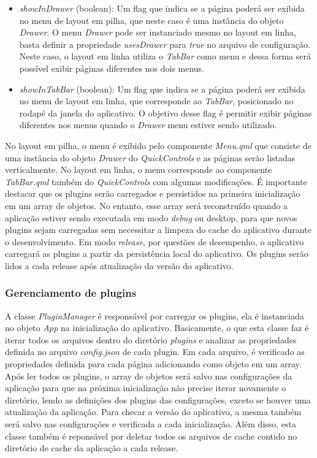 \begin{itemize}
	\item \textit{showInDrawer} (boolean): Um flag que indica se a página poderá ser exibida no menu de layout em pilha, que neste caso é uma instância do objeto \textit{Drawer}. O menu \textit{Drawer} pode ser instanciado mesmo no layout em linha, basta definir a propriedade \textit{usesDrawer} para \textit{true} no arquivo de configuração. Neste caso, o layout em linha utiliza o \textit{TabBar} como menu e dessa forma será possível exibir páginas diferentes nos dois menus.

	\item \textit{showInTabBar} (boolean): Um flag que indica se a página poderá ser exibida no menu de layout em linha, que corresponde ao \textit{TabBar}, posicionado no rodapé da janela do aplicativo. O objetivo desse flag é permitir exibir páginas diferentes nos menus quando o \textit{Drawer} menu estiver sendo utilizado.
\end{itemize}

No layout em pilha, o menu é exibido pelo componente \textit{Menu.qml} que consiste de uma instância do objeto \textit{Drawer} do \textit{QuickControls} e as páginas serão listadas verticalmente. No layout em linha, o menu corresponde ao componente \textit{TabBar.qml} também do \textit{QuickControls} com algumas modificações. É importante destacar que os plugins serão carregados e persistidos na primeira inicialização em um array de objetos. No entanto, esse array será reconstruído quando a aplicação estiver sendo executada em modo \textit{debug} ou desktop, para que novos plugins sejam carregadas sem necessitar a limpeza do cache do aplicativo durante o desenvolvimento. Em modo \textit{release}, por questões de desempenho, o aplicativo carregará as plugins a partir da persistência local do aplicativo. Os plugins serão lidos a cada release após atualização da versão do aplicativo.\par


\subsubsection{Gerenciamento de plugins}\label{sec:solucao-desenvolvida}
A classe \textit{PluginManager} é responsável por carregar os plugins, ela é instanciada no objeto \textit{App} na inicialização do aplicativo. Basicamente, o que esta classe faz é iterar todos os arquivos dentro do diretório \textit{plugins} e analizar as propriedades definida no arquivo \textit{config.json} de cada plugin. Em cada arquivo, é verificado as propriedades definida para cada página adicionando como objeto em um array. Após ler todos os plugins, o array de objetos será salvo nas configurações da aplicação para que na próxima inicialização não precise iterar novamente o diretório, lendo as definições dos plugins das configurações, exceto se houver uma atualização da aplicação. Para checar a versão do aplicativo, a mesma também será salvo nas configurações e verificada a cada inicialização. Além disso, esta classe também é reponsável por deletar todos os arquivos de cache contido no diretório de cache da aplicação a cada release.


